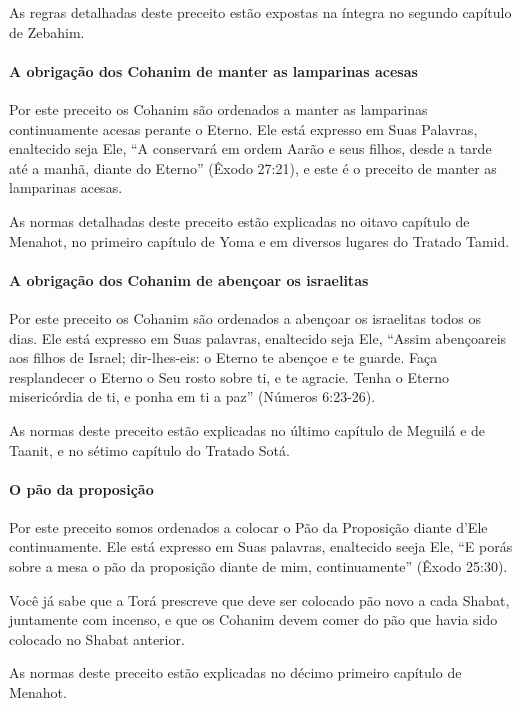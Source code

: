 As regras detalhadas deste preceito estão expostas na íntegra no segundo
capítulo de Zebahim.

\paragraph{A obrigação dos Cohanim de manter as lamparinas acesas}

Por este preceito os Cohanim são ordenados a manter as lamparinas
continuamente acesas perante o Eterno. Ele está expresso em Suas
Palavras, enaltecido seja Ele, ``A conservará em ordem Aarão e seus
filhos, desde a tarde até a manhã, diante do Eterno'' (Êxodo 27:21), e
este é o preceito de manter as lamparinas acesas.

As normas detalhadas deste preceito estão explicadas no oitavo capítulo
de Menahot, no primeiro capítulo de Yoma e em diversos lugares do
Tratado Tamid.

\paragraph{A obrigação dos Cohanim de abençoar os israelitas}

Por este preceito os Cohanim são ordenados a abençoar os israelitas
todos os dias. Ele está expresso em Suas palavras, enaltecido seja Ele,
``Assim abençoareis aos filhos de Israel; dir-lhes-eis: o Eterno te
abençoe e te guarde. Faça resplandecer o Eterno o Seu rosto sobre ti, e
te agracie. Tenha o Eterno misericórdia de ti, e ponha em ti a paz''
(Números 6:23-26).

As normas deste preceito estão explicadas no último capítulo de Meguilá
e de Taanit, e no sétimo capítulo do Tratado Sotá.

\paragraph{O pão da proposição}

Por este preceito somos ordenados a colocar o Pão da Proposição diante
d'Ele continuamente. Ele está expresso em Suas palavras, enaltecido
seeja Ele, ``E porás sobre a mesa o pão da proposição diante de mim,
continuamente'' (Êxodo 25:30).

Você já sabe que a Torá prescreve que deve ser colocado pão novo a cada Shabat, juntamente com incenso, e que os Cohanim devem
comer do pão que havia sido colocado no Shabat anterior.

As normas deste preceito estão explicadas no décimo primeiro capítulo
de Menahot.

